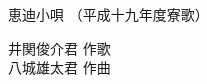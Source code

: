\documentclass[10pt,b5j]{tarticle} %
\begin{document}
\begin{minipage}[c]{0.7\hsize} %
    \begin{center}
        {\LARGE
            恵迪小唄 %
        }
        {\small 
            （平成十九年度寮歌） %
        }
    \end{center}
\end{minipage}
\begin{minipage}[c]{0.3\hsize} %
    \begin{flushright} %
        井関俊介君 作歌\\八城雄太君 作曲 %
    \end{flushright}
\end{minipage}
\end{document}

